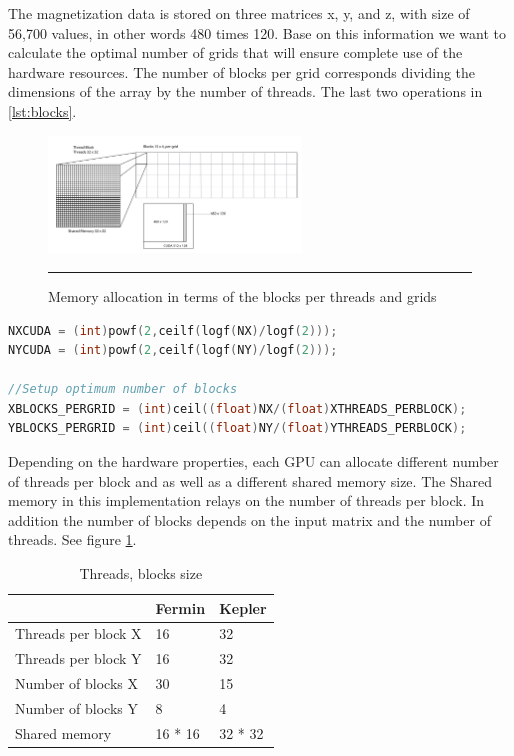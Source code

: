 The magnetization data is stored on three matrices x, y, and z, with size of 56,700 values, in other words 480 times 120. Base on this information we want to calculate the optimal number of grids that will ensure complete use of the hardware resources. The number of blocks per grid corresponds dividing the dimensions of the array by the number of threads. The last two operations in \ref{lst:blocks}.

\begin{figure}[htbp]
	\centering
		\includegraphics[width=0.6\textwidth]{Figures/block.png}
		\rule{35em}{0.2pt}
	\caption[Grid layout]{Memory allocation in terms of the blocks per threads and grids}
	\label{fig:block}
\end{figure}

\begin{lstlisting}[language=C++, label={lst:blocks}, caption={Device capacity calculation and number of block per grid}]	
NXCUDA = (int)powf(2,ceilf(logf(NX)/logf(2)));
NYCUDA = (int)powf(2,ceilf(logf(NY)/logf(2)));

//Setup optimum number of blocks
XBLOCKS_PERGRID = (int)ceil((float)NX/(float)XTHREADS_PERBLOCK); 
YBLOCKS_PERGRID = (int)ceil((float)NY/(float)YTHREADS_PERBLOCK);
\end{lstlisting}

Depending on the hardware properties, each GPU can allocate different number of threads per block and as well as a different shared memory size. The Shared memory in this implementation relays on the number of threads per block. In addition the number of blocks depends on the input matrix and the number of threads. See figure \ref{fig:block}.

\begin{table}[h]
\centering
\begin{tabular}{| l | l | l |}
\hline
 & Fermin & Kepler \\
\hline
Threads per block X  & 16 & 32 \\
\hline
Threads per block Y  & 16 & 32 \\
\hline
Number of blocks X & 30 & 15 \\
\hline
Number of blocks Y & 8 & 4 \\
\hline
Shared memory & 16 * 16 & 32 * 32 \\
\hline
\end{tabular}
\caption{Threads, blocks size}
\label{tab:threads}
\end{table}

